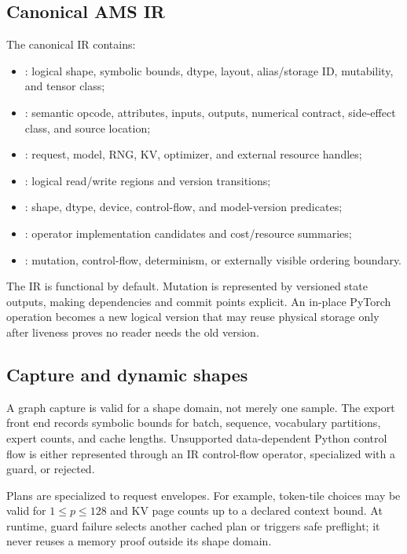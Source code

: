 \subsection{Canonical AMS IR}

The canonical IR contains:

\begin{itemize}
  \item {}: logical shape, symbolic bounds, dtype, layout, alias/storage ID, mutability, and tensor class;
  \item {}: semantic opcode, attributes, inputs, outputs, numerical contract, side-effect class, and source location;
  \item {}: request, model, RNG, KV, optimizer, and external resource handles;
  \item {}: logical read/write regions and version transitions;
  \item {}: shape, dtype, device, control-flow, and model-version predicates;
  \item {}: operator implementation candidates and cost/resource summaries;
  \item {}: mutation, control-flow, determinism, or externally visible ordering boundary.
\end{itemize}

The IR is functional by default. Mutation is represented by versioned state outputs, making dependencies and commit points explicit. An in-place PyTorch operation becomes a new logical version that may reuse physical storage only after liveness proves no reader needs the old version.

\subsection{Capture and dynamic shapes}

A graph capture is valid for a shape domain, not merely one sample. The export front end records symbolic bounds for batch, sequence, vocabulary partitions, expert counts, and cache lengths. Unsupported data-dependent Python control flow is either represented through an IR control-flow operator, specialized with a guard, or rejected.

Plans are specialized to request envelopes. For example, token-tile choices may be valid for $1\le p\le128$ and KV page counts up to a declared context bound. At runtime, guard failure selects another cached plan or triggers safe preflight; it never reuses a memory proof outside its shape domain.

